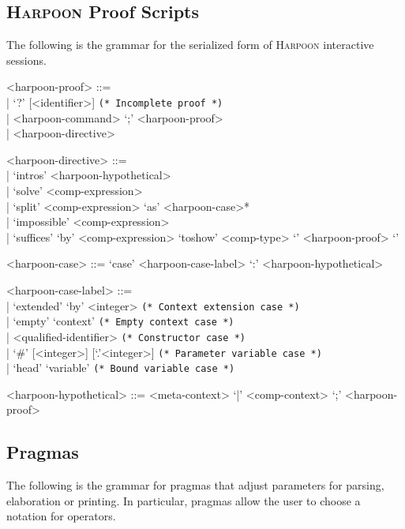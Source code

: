 \documentclass[11pt]{article}
\newcommand{\Harpoon}{\textsc{Harpoon}\xspace}
\begin{document}
\subsection{\Harpoon Proof Scripts}\label{section:syntax-harpoon-proof-scripts}

The following is the grammar for the serialized form of \Harpoon interactive sessions.

\begin{grammar}
<harpoon-proof> ::= \hfill\\
| `?' [<identifier>] \hfill \texttt{(* Incomplete proof *)}\\
| <harpoon-command> `;' <harpoon-proof>\\
| <harpoon-directive>


<harpoon-directive> ::= \hfill\\
| `intros' <harpoon-hypothetical>\\
| `solve' <comp-expression>\\
| `split' <comp-expression> `as' <harpoon-case>*\\
| `impossible' <comp-expression>\\
| `suffices' `by' <comp-expression> `toshow' <comp-type> `{' <harpoon-proof> `}'

<harpoon-case> ::= `case' <harpoon-case-label> `:' <harpoon-hypothetical>

<harpoon-case-label> ::= \hfill\\
| `extended' `by' <integer> \hfill \texttt{(* Context extension case *)}\\
| `empty' `context' \hfill \texttt{(* Empty context case *)}\\
| <qualified-identifier> \hfill \texttt{(* Constructor case *)}\\
| `#' [<integer>] [`.'<integer>] \hfill \texttt{(* Parameter variable case *)}\\
| `head' `variable' \hfill \texttt{(* Bound variable case *)}

<harpoon-hypothetical> ::= <meta-context> `|' <comp-context> `;' <harpoon-proof>
\end{grammar}

\subsection{Pragmas}\label{section:syntax-pragmas}

The following is the grammar for pragmas that adjust parameters for parsing, elaboration or printing.
In particular, pragmas allow the user to choose a notation for operators.
\end{document}
